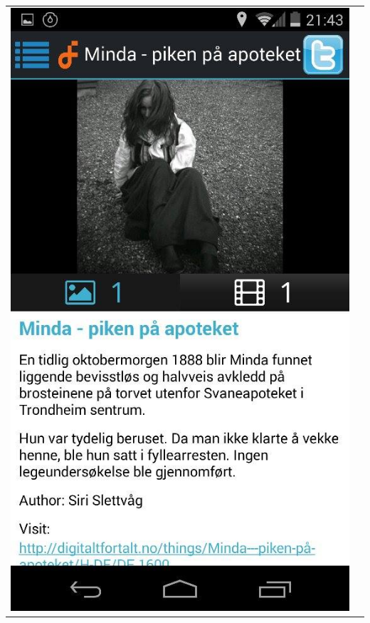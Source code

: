\documentclass[12pt,a4paper,titlepage]{article}
\begin{document}
\begin{center}
\begin{tabular}{cc}
	 	\includegraphics[width=0.35 \textwidth]{res/ScreenShot4.jpg}\\
\end{tabular}
\end{center}
\end{document}
